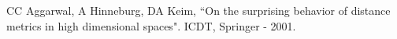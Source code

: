 \documentclass[conference]{IEEEtran}
\begin{document}
\begin{thebibliography}{00}
	 CC Aggarwal, A Hinneburg, DA Keim, ``On the surprising behavior of distance metrics in high dimensional spaces". ICDT, Springer - 2001.
\end{thebibliography}
\end{document}
